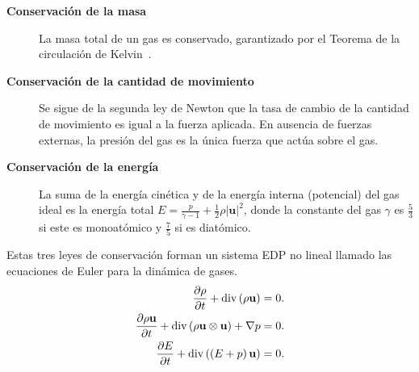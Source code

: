 \begin{description}
	\item[\bfseries Conservación de la masa]

	      La masa total de un gas es conservado, garantizado
	      por el Teorema de la circulación de
	      Kelvin~\cite[pág. 28]{Wesseling2001}.

	\item[\bfseries Conservación de la cantidad de movimiento]

	      Se sigue de la segunda ley de Newton que la tasa de cambio de
	      la cantidad de movimiento es igual a la fuerza aplicada.
	      En ausencia de fuerzas externas, la presión del gas es la
	      única fuerza que actúa sobre el gas.

	\item[\bfseries Conservación de la energía]

	      La suma de la energía cinética y de la energía interna
	      (potencial) del gas ideal es la energía total
	      \begin{math}
		      E=
		      \frac{p}{\gamma-1}+
		      \frac{1}{2}
		      \rho{\left|\mathbf{u}\right|}^{2}
	      \end{math},
	      donde la constante del gas $\gamma$ es $\frac{5}{3}$ si este
	      es monoatómico y $\frac{7}{5}$ si es diatómico.
\end{description}

Estas tres leyes de conservación forman un sistema EDP no lineal
llamado las ecuaciones de Euler para la dinámica de gases.
\begin{align}
	\diffp{\rho}{t}+
	\operatorname{div}
	\left(\rho\mathbf{u}\right)             & =
	0.                                          \\
	\diffp{\rho\mathbf{u}}{t}+
	\operatorname{div}
	\left(\rho\mathbf{u}\otimes\mathbf{u}\right)+
	\nabla p                                & =
	0.                                          \\
	\diffp{E}{t}+
	\operatorname{div}
	\left(\left(E+p\right)\mathbf{u}\right) & =
	0.
\end{align}

